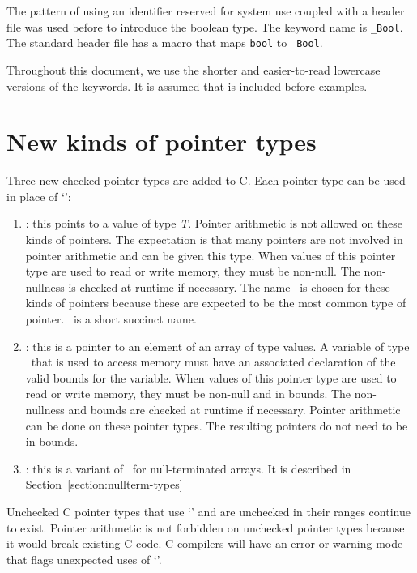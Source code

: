 The pattern of using an identifier reserved for system use coupled with
a header file was used before to introduce the boolean type. The keyword
name is \lstinline+_Bool+.  The standard header file 
has a macro that maps \lstinline+bool+ to \lstinline+_Bool+.

Throughout this document, we use the shorter and easier-to-read
lowercase versions of the keywords.  It is assumed
that  is included before examples.

\section{New kinds of pointer types}
Three new checked pointer types are added to C. Each pointer type can be
used in place of `\code{*}':
\begin{enumerate}
\item
  \ptrT: this points to
  a value of type \textit{T}. Pointer arithmetic is not allowed on these
  kinds of pointers. The expectation is that many pointers are not
  involved in pointer arithmetic and can be given this type. When
  values of this pointer type are used to read or write memory, they
  must be non-null. The non-nullness is checked at runtime if necessary.
  The name \ptr\ is chosen for these kinds of pointers because these
  are expected to be the most common type of pointer. \ptr\
  is a short succinct name.
\item
  \arrayptrT: this is
  a pointer to an element of an array of type  values. A
  variable of type \arrayptr\ that is used to access memory
  must have an associated declaration of the valid bounds for the
  variable. When values of this pointer type are used to read or write
  memory, they must be non-null and in bounds. The non-nullness and
  bounds are checked at runtime if necessary. Pointer arithmetic can be
  done on these pointer types. The resulting pointers do not need to be
  in bounds.
\item
 \ntarrayptrT: this is a variant of \arrayptrT\ for null-terminated
 arrays.  It is described in Section~\ref{section:nullterm-types}
\end{enumerate}

Unchecked C pointer types that use `\code{*}' and are unchecked in their
ranges continue to exist. Pointer arithmetic is not forbidden on unchecked
pointer types because it would break existing C code. C compilers will
have an error or warning mode that flags unexpected uses of `\code{*}'.

